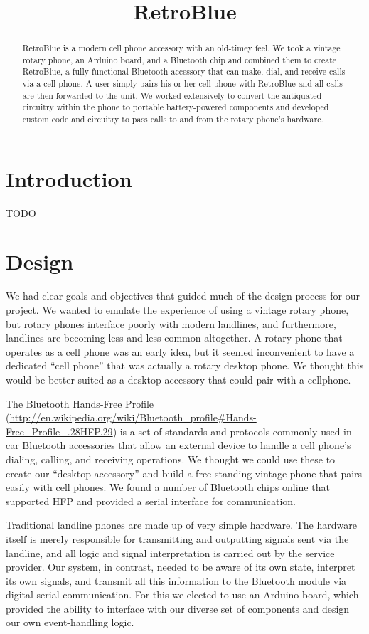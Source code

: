 \documentclass{es50report}
\title{RetroBlue}
\begin{document}
    \maketitlepage

    \begin{abstract}
        RetroBlue is a modern cell phone accessory with an old-timey feel. We took a vintage rotary phone, an Arduino board, and a Bluetooth chip and combined them to create RetroBlue, a fully functional Bluetooth accessory that can make, dial, and receive calls via a cell phone. A user simply pairs his or her cell phone with RetroBlue and all calls are then forwarded to the unit. We worked extensively to convert the antiquated circuitry within the phone to portable battery-powered components and developed custom code and circuitry to pass calls to and from the rotary phone's hardware.
    \end{abstract}
    \newpage
    \doublespacing

    \section{Introduction}
    TODO

    \section{Design}
        We had clear goals and objectives that guided much of the design process for our project. We wanted to emulate the experience of using a vintage rotary phone, but rotary phones interface poorly with modern landlines, and furthermore, landlines are becoming less and less common altogether. A rotary phone that operates as a cell phone was an early idea, but it seemed inconvenient to have a dedicated ``cell phone'' that was actually a rotary desktop phone. We thought this would be better suited as a desktop accessory that could pair with a cellphone.
        
        The Bluetooth Hands-Free Profile (\url{http://en.wikipedia.org/wiki/Bluetooth_profile#Hands-Free_Profile_.28HFP.29}) is a set of standards and protocols commonly used in car Bluetooth accessories that allow an external device to handle a cell phone's dialing, calling, and receiving operations. We thought we could use these to create our ``desktop accessory'' and build a free-standing vintage phone that pairs easily with cell phones. We found a number of Bluetooth chips online that supported HFP and provided a serial interface for communication.
        
        Traditional landline phones are made up of very simple hardware. The hardware itself is merely responsible for transmitting and outputting signals sent via the landline, and all logic and signal interpretation is carried out by the service provider. Our system, in contrast, needed to be aware of its own state, interpret its own signals, and transmit all this information to the Bluetooth module via digital serial communication. For this we elected to use an Arduino board, which provided the ability to interface with our diverse set of components and design our own event-handling logic.
\end{document}
